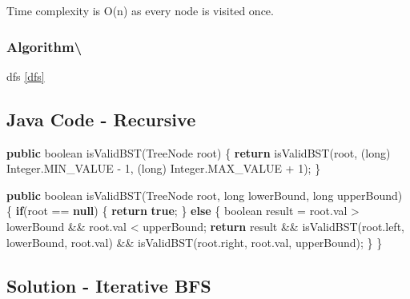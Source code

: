 \documentclass[]{book}
\newenvironment{Shaded}{\begin{snugshade}}{\end{snugshade}}
\newcommand{\BuiltInTok}[1]{#1}
\newcommand{\DataTypeTok}[1]{\textcolor[rgb]{0.13,0.29,0.53}{#1}}
\newcommand{\DecValTok}[1]{\textcolor[rgb]{0.00,0.00,0.81}{#1}}
\newcommand{\FunctionTok}[1]{\textcolor[rgb]{0.00,0.00,0.00}{#1}}
\newcommand{\KeywordTok}[1]{\textcolor[rgb]{0.13,0.29,0.53}{\textbf{#1}}}
\newcommand{\NormalTok}[1]{#1}
\begin{document}
Time complexity is O(n) as every node is visited once.

\hypertarget{algorithm-86}{%
\subsubsection{Algorithm\textbackslash{}}\label{algorithm-86}}

dfs \ref{dfs}

\hypertarget{java-code---recursive-4}{%
\subsection{Java Code - Recursive}\label{java-code---recursive-4}}

\begin{Shaded}
\begin{Highlighting}[]
\KeywordTok{public} \DataTypeTok{boolean} \FunctionTok{isValidBST}\NormalTok{(}\BuiltInTok{TreeNode}\NormalTok{ root) \{}
    \KeywordTok{return} \FunctionTok{isValidBST}\NormalTok{(root, (}\DataTypeTok{long}\NormalTok{) }\BuiltInTok{Integer}\NormalTok{.}\FunctionTok{MIN_VALUE}\NormalTok{ - }\DecValTok{1}\NormalTok{, (}\DataTypeTok{long}\NormalTok{) }\BuiltInTok{Integer}\NormalTok{.}\FunctionTok{MAX_VALUE}\NormalTok{ + }\DecValTok{1}\NormalTok{);}
\NormalTok{\}}

\KeywordTok{public} \DataTypeTok{boolean} \FunctionTok{isValidBST}\NormalTok{(}\BuiltInTok{TreeNode}\NormalTok{ root, }\DataTypeTok{long}\NormalTok{ lowerBound, }\DataTypeTok{long}\NormalTok{ upperBound) \{}
    \KeywordTok{if}\NormalTok{(root == }\KeywordTok{null}\NormalTok{) \{}
        \KeywordTok{return} \KeywordTok{true}\NormalTok{;}
\NormalTok{    \} }\KeywordTok{else}\NormalTok{ \{}
        \DataTypeTok{boolean}\NormalTok{ result = root.}\FunctionTok{val}\NormalTok{ > lowerBound && root.}\FunctionTok{val}\NormalTok{ < upperBound;}
        \KeywordTok{return}\NormalTok{ result && }\FunctionTok{isValidBST}\NormalTok{(root.}\FunctionTok{left}\NormalTok{, lowerBound, root.}\FunctionTok{val}\NormalTok{) &&}
            \FunctionTok{isValidBST}\NormalTok{(root.}\FunctionTok{right}\NormalTok{, root.}\FunctionTok{val}\NormalTok{, upperBound);}
\NormalTok{    \}}
\NormalTok{\}}
\end{Highlighting}
\end{Shaded}

\hypertarget{solution---iterative-bfs-1}{%
\subsection{Solution - Iterative BFS}\label{solution---iterative-bfs-1}}
\end{document}
